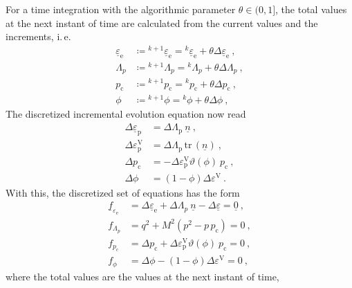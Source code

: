 \documentclass[paper=a4, twoside, pagesize]{scrartcl}
\newcommand{\tensor}[1]{\underline{#1}}
\renewcommand{\c}{\text{c}}
\newcommand{\e}{\text{e}}
\newcommand{\p}{\text{p}}
\newcommand{\trace}{\mathrm{tr}\,}
\begin{document}
For a time integration with the algorithmic parameter $\theta\in(0,1]$, the total values at the next instant of time are calculated from the current values and the increments, i.\,e. 
\begin{subequations}
\begin{align}
  \tensor\varepsilon_\e &\coloneqq {}^{k+1}\tensor\varepsilon_\e = {}^{k}\tensor\varepsilon_\e + \theta\varDelta \tensor\varepsilon_\e\ , \\
  \varLambda_p &\coloneqq {}^{k+1}\varLambda_p = {}^{k}\varLambda_p + \theta\varDelta \varLambda_p\ , \\
  p_\c &\coloneqq {}^{k+1}p_\c = {}^{k}p_\c + \theta\varDelta p_\c\ , \\
  \phi &\coloneqq {}^{k+1}\phi = {}^{k}\phi + \theta\varDelta\phi \ ,
\end{align}
\end{subequations}
The discretized incremental evolution equation now read
\begin{subequations}
\begin{align}
  \varDelta\tensor\varepsilon_\p &= \varDelta{\varLambda}_\p\ \tensor n\ , \\
  \varDelta{\varepsilon}_\p^\text{V} &= \varDelta{\varLambda}_\p\,\trace(\tensor n)\ , \\  
  \varDelta{p}_\c &= -\varDelta{\varepsilon}_\p^\text{V} \vartheta(\phi)\ p_\c\ , \\
  \varDelta\phi &= (1-\phi) \varDelta\varepsilon^\text{V} \ .
\end{align}
\end{subequations}
With this, the discretized set of equations has the form
\begin{subequations}\label{eq:incrementalSystem}
\begin{align}
  \tensor f_{\!\varepsilon_\e} &= \varDelta\tensor\varepsilon_\e + \varDelta\varLambda_p\ \tensor n - \varDelta\tensor\varepsilon = \tensor0 \ ,\\
  f_{\!\varLambda_p} &= q^2 + M^2(p^2 - p\,p_\c) = 0 \ , \label{eq:flp}\\ %
  f_{p_\c} &= \varDelta p_\c + \varDelta\varepsilon_\p^\text{V} \vartheta(\phi)\ p_\c = 0 \ , \label{eq:fpc} \\
  f_{\phi} &= \varDelta\phi - (1-\phi) \varDelta\varepsilon^\text{V} = 0 \ , \label{eq:fphi}
\end{align}
\end{subequations}
where the total values are the values at the next instant of time,
\end{document}
